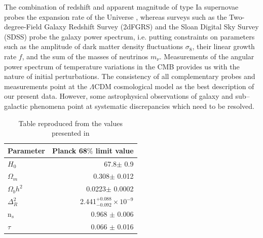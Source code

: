 \documentclass[a4wide,12pt]{book}
\begin{document}
{The combination of redshift and apparent magnitude of type Ia supernovae probes the expansion rate of the Universe \citep[][]{Riess+1998, Perlmutter+1999}, whereas surveys such as the Two-degree-Field Galaxy Redshift Survey (2dFGRS) \citep[][]{2dFGRS} and the Sloan Digital Sky Survey (SDSS) \citep[][]{SDSS} probe the galaxy power spectrum, i.e. putting constraints on parameters such as the amplitude of dark matter density fluctuations $\sigma_8$, their linear growth rate $f$, and the sum of the masses of neutrinos $m_\nu$. Measurements of the angular power spectrum of temperature variations in the CMB \citep[COBE, WMAP, Planck][]{} provides us with the nature of initial perturbations. The consistency of all complementary probes and measurements point at the $\Lambda$CDM cosmological model as the best description of our present data. However, some astrophysical observations of galaxy and sub--galactic phenomena point at systematic discrepancies which need to be resolved.
\begin{table}
\begin{tabular}{l{}r}
\label{tab:LCDM_Planck15}
Parameter & Planck 68$\%$ limit value \\
\hline
$H_0$ & 67.8$\pm$ 0.9 \\
$\Omega_m$ & 0.308$\pm$ 0.012 \\
$\Omega_b h^2$ & 0.0223$\pm$ 0.0002 \\
$\Delta^2_R$ & 2.441$^{+0.088}_{-0.092} \times 10^{-9}$ \\
n$_s$ & 0.968 $\pm$ 0.006\\
$\tau$ & 0.066 $\pm$ 0.016\\
\end{tabular}
\caption[Table caption text]{Table reproduced from the values presented in \citet[][]{Planck2015}}
\end{table}

}
\end{document}
